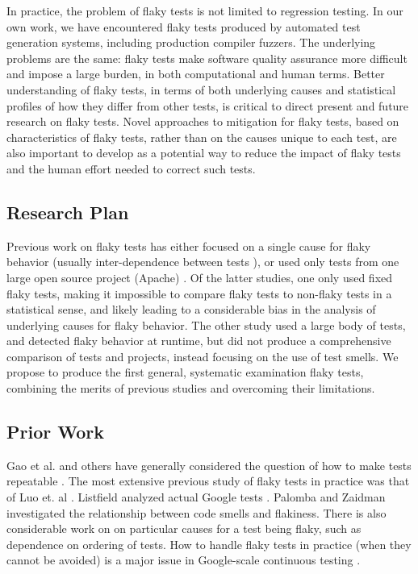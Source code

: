 \documentclass[10pt]{article}
\begin{document}
In practice, the problem of flaky tests is not limited to regression testing.  In our own work, we have encountered flaky tests produced by automated test generation systems, including production compiler fuzzers.  The underlying problems are the same:  flaky tests make software quality assurance more difficult and impose a large burden, in both computational and human terms.  Better understanding of flaky tests, in terms of both underlying causes and statistical profiles of how they differ from other tests, is critical to direct present and future research on flaky tests.  Novel approaches to mitigation for flaky tests, based on characteristics of flaky tests, rather than on the causes unique to each test, are also important to develop as a potential way to reduce the impact of flaky tests and the human effort needed to correct such tests.

\subsection{Research Plan}

Previous work on flaky tests has either focused on a single cause for flaky behavior (usually inter-dependence between tests \cite{LamZE2015}), or used only tests from one large open source project (Apache) \cite{luo2014empirical,palomba2017does}.  Of the latter studies, one \cite{luo2014empirical} only used fixed flaky tests, making it impossible to compare flaky tests to non-flaky tests in a statistical sense, and likely leading to a considerable bias in the analysis of underlying causes for flaky behavior.  The other study \cite{palomba2017does} used a large body of tests, and detected flaky behavior at runtime, but did not produce a comprehensive comparison of tests and projects, instead focusing on the use of test smells.  We propose to produce the first general, systematic examination flaky tests, combining the merits of previous studies and overcoming their limitations.


\subsection{Prior Work}


Gao et al. and others have generally considered the question of how to make tests repeatable \cite{Gao:2015:MSU:2818754.2818764}.  
The most extensive previous study of flaky tests in practice was that of Luo et. al \cite{luo2014empirical}.  Listfield analyzed actual Google tests \cite{listfieldtestanalysis}. Palomba and Zaidman \cite{palomba2017does} investigated the relationship between code smells and flakiness.  There is also considerable work on \cite{LamZE2015} on particular causes for a test being flaky, such as dependence on ordering of tests.  How to handle flaky tests in practice (when they cannot be avoided) is a major issue in Google-scale continuous testing \cite{memon2017taming}.
\end{document}
